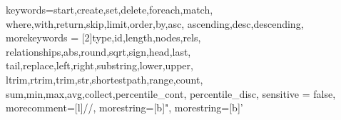\documentclass[10pt,a4paper,twoside]{tudelft-report}
\begin{document}
% 
% 
% 
%   
% 
% 
% 
% 
% 
% 
% 

\frontmatter


 {
  keywords={start,create,set,delete,foreach,match,%
    where,with,return,skip,limit,order,by,asc,%
    ascending,desc,descending},
  morekeywords = {[2]type,id,length,nodes,rels,%
    relationships,abs,round,sqrt,sign,head,last,%
    tail,replace,left,right,substring,lower,upper,%
    ltrim,rtrim,trim,str,shortestpath,range,count,%
    sum,min,max,avg,collect,percentile\_cont,%
    percentile\_disc},
  sensitive = false,
  morecomment=[l]{//},
  morestring=[b]",
  morestring=[b]'
}
 
\lstset{style=mystyle}





\tableofcontents

\mainmatter
\end{document}
